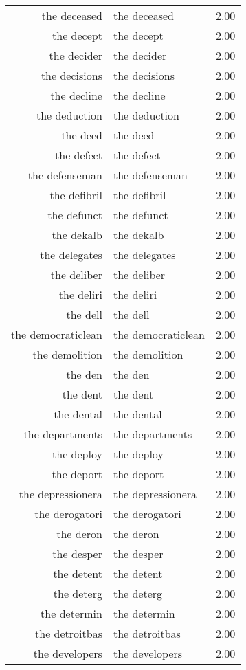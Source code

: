 \begin{table}[ht]
\begin{tabular}{rlr}
  the deceased & the deceased & 2.00 \\ 
  the decept & the decept & 2.00 \\ 
  the decider & the decider & 2.00 \\ 
  the decisions & the decisions & 2.00 \\ 
  the decline & the decline & 2.00 \\ 
  the deduction & the deduction & 2.00 \\ 
  the deed & the deed & 2.00 \\ 
  the defect & the defect & 2.00 \\ 
  the defenseman & the defenseman & 2.00 \\ 
  the defibril & the defibril & 2.00 \\ 
  the defunct & the defunct & 2.00 \\ 
  the dekalb & the dekalb & 2.00 \\ 
  the delegates & the delegates & 2.00 \\ 
  the deliber & the deliber & 2.00 \\ 
  the deliri & the deliri & 2.00 \\ 
  the dell & the dell & 2.00 \\ 
  the democraticlean & the democraticlean & 2.00 \\ 
  the demolition & the demolition & 2.00 \\ 
  the den & the den & 2.00 \\ 
  the dent & the dent & 2.00 \\ 
  the dental & the dental & 2.00 \\ 
  the departments & the departments & 2.00 \\ 
  the deploy & the deploy & 2.00 \\ 
  the deport & the deport & 2.00 \\ 
  the depressionera & the depressionera & 2.00 \\ 
  the derogatori & the derogatori & 2.00 \\ 
  the deron & the deron & 2.00 \\ 
  the desper & the desper & 2.00 \\ 
  the detent & the detent & 2.00 \\ 
  the deterg & the deterg & 2.00 \\ 
  the determin & the determin & 2.00 \\ 
  the detroitbas & the detroitbas & 2.00 \\ 
  the developers & the developers & 2.00 \\ 

\end{tabular}
\end{table}

